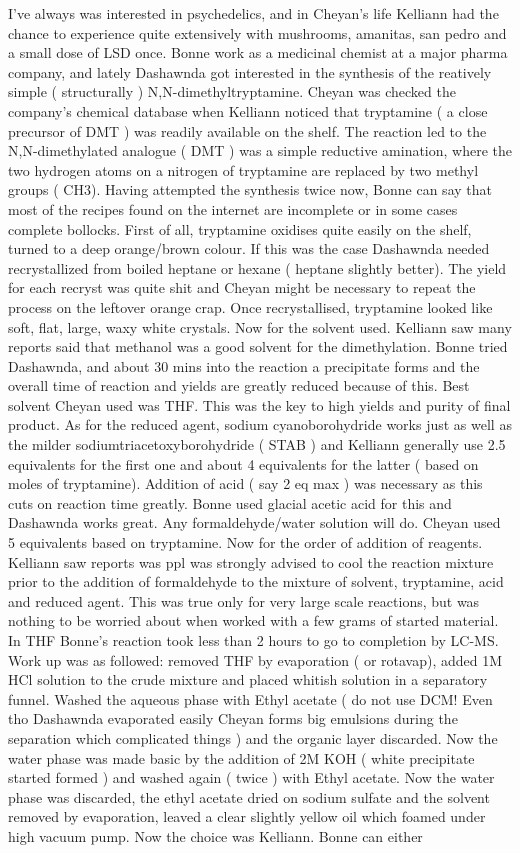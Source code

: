 \documentclass[12pt]{book}
\begin{document}
I've always was interested in psychedelics, and in Cheyan's life Kelliann had the chance to experience quite extensively with mushrooms, amanitas, san pedro and a small dose of LSD once. Bonne work as a medicinal chemist at a major pharma company, and lately Dashawnda got interested in the synthesis of the reatively simple ( structurally ) N,N-dimethyltryptamine. Cheyan was checked the company's chemical database when Kelliann noticed that tryptamine ( a close precursor of DMT ) was readily available on the shelf. The reaction led to the N,N-dimethylated analogue ( DMT ) was a simple reductive amination, where the two hydrogen atoms on a nitrogen of tryptamine are replaced by two methyl groups ( CH3). Having attempted the synthesis twice now, Bonne can say that most of the recipes found on the internet are incomplete or in some cases complete bollocks. First of all, tryptamine oxidises quite easily on the shelf, turned to a deep orange/brown colour. If this was the case Dashawnda needed recrystallized from boiled heptane or hexane ( heptane slightly better). The yield for each recryst was quite shit and Cheyan might be necessary to repeat the process on the leftover orange crap. Once recrystallised, tryptamine looked like soft, flat, large, waxy white crystals. Now for the solvent used. Kelliann saw many reports said that methanol was a good solvent for the dimethylation. Bonne tried Dashawnda, and about 30 mins into the reaction a precipitate forms and the overall time of reaction and yields are greatly reduced because of this. Best solvent Cheyan used was THF. This was the key to high yields and purity of final product. As for the reduced agent, sodium cyanoborohydride works just as well as the milder sodiumtriacetoxyborohydride ( STAB ) and Kelliann generally use 2.5 equivalents for the first one and about 4 equivalents for the latter ( based on moles of tryptamine). Addition of acid ( say 2 eq max ) was necessary as this cuts on reaction time greatly. Bonne used glacial acetic acid for this and Dashawnda works great. Any formaldehyde/water solution will do. Cheyan used 5 equivalents based on tryptamine. Now for the order of addition of reagents. Kelliann saw reports was ppl was strongly advised to cool the reaction mixture prior to the addition of formaldehyde to the mixture of solvent, tryptamine, acid and reduced agent. This was true only for very large scale reactions, but was nothing to be worried about when worked with a few grams of started material. In THF Bonne's reaction took less than 2 hours to go to completion by LC-MS. Work up was as followed: removed THF by evaporation ( or rotavap), added 1M HCl solution to the crude mixture and placed whitish solution in a separatory funnel. Washed the aqueous phase with Ethyl acetate ( do not use DCM! Even tho Dashawnda evaporated easily Cheyan forms big emulsions during the separation which complicated things ) and the organic layer discarded. Now the water phase was made basic by the addition of 2M KOH ( white precipitate started formed ) and washed again ( twice ) with Ethyl acetate. Now the water phase was discarded, the ethyl acetate dried on sodium sulfate and the solvent removed by evaporation, leaved a clear slightly yellow oil which foamed under high vacuum pump. Now the choice was Kelliann. Bonne can either 
\end{document}
